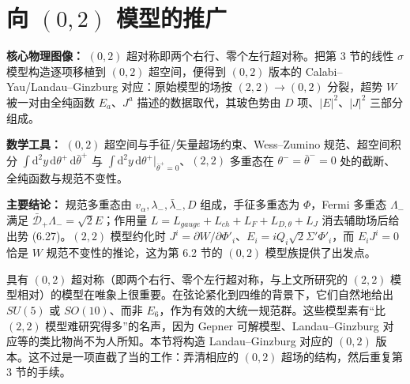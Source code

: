 
\section{向 $(0,2)$ 模型的推广}

\begin{keytakeaway}
\textbf{核心物理图像：}
$(0,2)$ 超对称即两个右行、零个左行超对称。把第 3 节的线性 $\sigma$ 模型构造逐项移植到 $(0,2)$ 超空间，便得到 $(0,2)$ 版本的 Calabi--Yau/Landau--Ginzburg 对应：原始模型的场按 $(2,2)\to(0,2)$ 分裂，超势 $W$ 被一对由全纯函数 $E_a$、$J^a$ 描述的数据取代，其玻色势由 $D$ 项、$|E|^2$、$|J|^2$ 三部分组成。
\par\textbf{数学工具：}
$(0,2)$ 超空间与手征/矢量超场约束、Wess--Zumino 规范、超空间积分 $\int\mathrm{d}^2y\,\mathrm{d}\theta^+\,\mathrm{d}\bar\theta^+$ 与 $\int\mathrm{d}^2y\,\mathrm{d}\theta^+|_{\bar\theta^+=0}$、$(2,2)$ 多重态在 $\theta^-=\bar\theta^-=0$ 处的截断、全纯函数与规范不变性。
\par\textbf{主要结论：}
规范多重态由 $v_\alpha,\lambda_-,\bar\lambda_-,D$ 组成，手征多重态为 $\Phi$，Fermi 多重态 $\Lambda_-$ 满足 $\bar{\mathcal{D}}_+\Lambda_-=\sqrt2E$；作用量 $L=L_{gauge}+L_{ch}+L_F+L_{D,\theta}+L_J$ 消去辅助场后给出势 (6.27)。$(2,2)$ 模型约化时 $J^i=\partial W/\partial\Phi'_i$、$E_i=iQ_i\sqrt2\Sigma'\Phi'_i$，而 $E_iJ^i=0$ 恰是 $W$ 规范不变性的推论，这为第 6.2 节的 $(0,2)$ 模型族提供了出发点。
\end{keytakeaway}

具有 $(0,2)$ 超对称（即两个右行、零个左行超对称，与上文所研究的 $(2,2)$ 模型相对）的模型在唯象上很重要。在弦论紧化到四维的背景下，它们自然地给出 $SU(5)$ 或 $SO(10)$、而非 $E_6$，作为有效的大统一规范群。这些模型素有“比 $(2,2)$ 模型难研究得多”的名声，因为 Gepner 可解模型、Landau--Ginzburg 对应等的类比物尚不为人所知。本节将构造 Landau--Ginzburg 对应的 $(0,2)$ 版本。这不过是一项直截了当的工作：弄清相应的 $(0,2)$ 超场的结构，然后重复第 3 节的手续。

